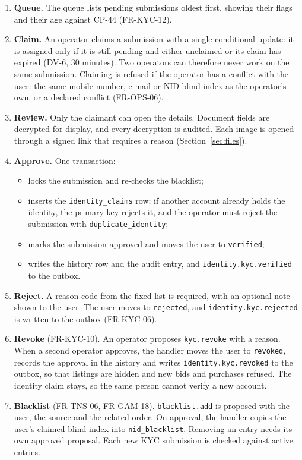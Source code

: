 \documentclass[11pt,a4paper]{article}
\begin{document}
\begin{enumerate}[nosep]
  \item \textbf{Queue.} The queue lists pending submissions oldest first, showing their flags and their age against CP-44 (FR-KYC-12).
  \item \textbf{Claim.} An operator claims a submission with a single conditional update: it is assigned only if it is still pending and either unclaimed or its claim has expired (DV-6, 30 minutes). Two operators can therefore never work on the same submission. Claiming is refused if the operator has a conflict with the user: the same mobile number, e-mail or NID blind index as the operator's own, or a declared conflict (FR-OPS-06).
  \item \textbf{Review.} Only the claimant can open the details. Document fields are decrypted for display, and every decryption is audited. Each image is opened through a signed link that requires a reason (Section~\ref{sec:files}).
  \item \textbf{Approve.} One transaction:
  \begin{itemize}[nosep]
    \item locks the submission and re-checks the blacklist;
    \item inserts the \texttt{identity\_claims} row; if another account already holds the identity, the primary key rejects it, and the operator must reject the submission with \texttt{duplicate\_identity};
    \item marks the submission approved and moves the user to \texttt{verified};
    \item writes the history row and the audit entry, and \texttt{identity.kyc.verified} to the outbox.
  \end{itemize}
  \item \textbf{Reject.} A reason code from the fixed list is required, with an optional note shown to the user. The user moves to \texttt{rejected}, and \texttt{identity.kyc.rejected} is written to the outbox (FR-KYC-06).
  \item \textbf{Revoke} (FR-KYC-10). An operator proposes \texttt{kyc.revoke} with a reason. When a second operator approves, the handler moves the user to \texttt{revoked}, records the approval in the history and writes \texttt{identity.kyc.revoked} to the outbox, so that listings are hidden and new bids and purchases refused. The identity claim stays, so the same person cannot verify a new account.
  \item \textbf{Blacklist} (FR-TNS-06, FR-GAM-18). \texttt{blacklist.add} is proposed with the user, the source and the related order. On approval, the handler copies the user's claimed blind index into \texttt{nid\_blacklist}. Removing an entry needs its own approved proposal. Each new KYC submission is checked against active entries.
\end{enumerate}
\end{document}
